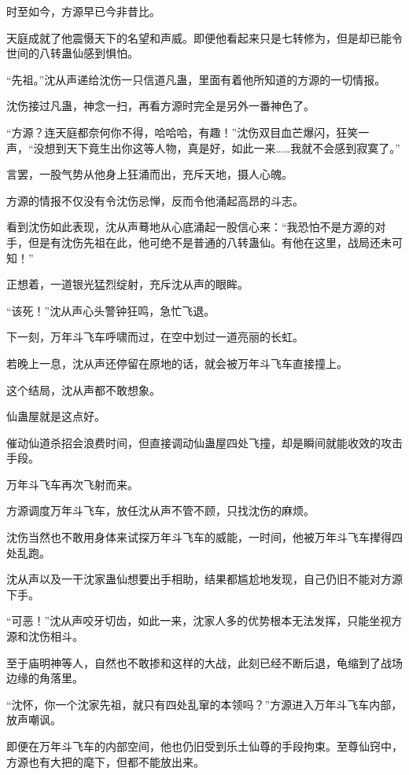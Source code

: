 
\begin{this_body}

时至如今，方源早已今非昔比。

天庭成就了他震慑天下的名望和声威。即便他看起来只是七转修为，但是却已能令世间的八转蛊仙感到惧怕。

“先祖。”沈从声递给沈伤一只信道凡蛊，里面有着他所知道的方源的一切情报。

沈伤接过凡蛊，神念一扫，再看方源时完全是另外一番神色了。

“方源？连天庭都奈何你不得，哈哈哈，有趣！”沈伤双目血芒爆闪，狂笑一声，“没想到天下竟生出你这等人物，真是好，如此一来……我就不会感到寂寞了。”

言罢，一股气势从他身上狂涌而出，充斥天地，摄人心魄。

方源的情报不仅没有令沈伤忌惮，反而令他涌起高昂的斗志。

看到沈伤如此表现，沈从声蓦地从心底涌起一股信心来：“我恐怕不是方源的对手，但是有沈伤先祖在此，他可绝不是普通的八转蛊仙。有他在这里，战局还未可知！”

正想着，一道银光猛烈绽射，充斥沈从声的眼眸。

“该死！”沈从声心头警钟狂鸣，急忙飞退。

下一刻，万年斗飞车呼啸而过，在空中划过一道亮丽的长虹。

若晚上一息，沈从声还停留在原地的话，就会被万年斗飞车直接撞上。

这个结局，沈从声都不敢想象。

仙蛊屋就是这点好。

催动仙道杀招会浪费时间，但直接调动仙蛊屋四处飞撞，却是瞬间就能收效的攻击手段。

万年斗飞车再次飞射而来。

方源调度万年斗飞车，放任沈从声不管不顾，只找沈伤的麻烦。

沈伤当然也不敢用身体来试探万年斗飞车的威能，一时间，他被万年斗飞车撵得四处乱跑。

沈从声以及一干沈家蛊仙想要出手相助，结果都尴尬地发现，自己仍旧不能对方源下手。

“可恶！”沈从声咬牙切齿，如此一来，沈家人多的优势根本无法发挥，只能坐视方源和沈伤相斗。

至于庙明神等人，自然也不敢掺和这样的大战，此刻已经不断后退，龟缩到了战场边缘的角落里。

“沈怀，你一个沈家先祖，就只有四处乱窜的本领吗？”方源进入万年斗飞车内部，放声嘲讽。

即便在万年斗飞车的内部空间，他也仍旧受到乐土仙尊的手段拘束。至尊仙窍中，方源也有大把的麾下，但都不能放出来。


\end{this_body}
